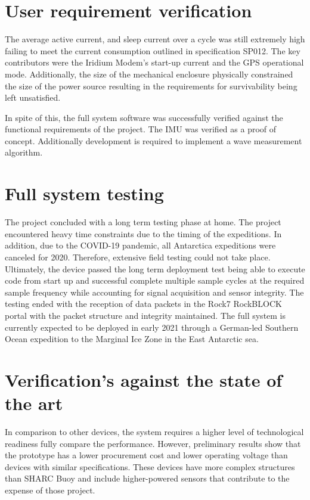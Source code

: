 \section{User requirement verification}
The average active current, and sleep current over a cycle was still extremely high failing to meet the current consumption outlined in specification SP012. The key contributors were the Iridium Modem's start-up current and the GPS operational mode. Additionally, the size of the mechanical enclosure physically constrained the size of the power source resulting in the requirements for survivability being left unsatisfied.\par 

In spite of this, the full system software was successfully verified against the functional requirements of the project. The IMU was verified as a proof of concept. Additionally development is required to implement  a wave measurement algorithm.

\section{Full system testing}

The project concluded with a long term testing phase at home. The project encountered heavy time constraints due to the timing of the expeditions. In addition, due to the COVID-19 pandemic, all Antarctica expeditions were canceled for 2020. Therefore, extensive field testing could not take place. Ultimately, the device passed the long term deployment test being able to execute code from start up and successful complete multiple sample cycles at the required sample frequency while accounting for signal acquisition and sensor integrity. The testing ended with the reception of data packets in the Rock7 RockBLOCK portal with the packet structure and integrity maintained. The full system is currently expected to be deployed in early 2021 through a German-led Southern Ocean expedition to the Marginal Ice Zone in the East Antarctic sea.

\section{Verification's against the state of the art}

In comparison to other devices, the system requires a higher level of technological readiness fully compare the performance. However, preliminary results show that the prototype has a lower procurement cost and lower operating voltage than devices with similar specifications. These devices have more complex structures than SHARC Buoy and include higher-powered sensors that contribute to the expense of those project.


